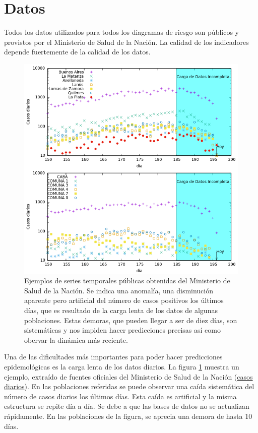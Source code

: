 \documentclass[12pt,a4paper]{article}
\begin{document}
\section*{Datos}
Todos los datos utilizados para todos los diagramas de riesgo 
son públicos y provistos por el Ministerio de Salud de la Nación.
La calidad de los indicadores depende fuertemente de la calidad de los datos.
\begin{figure}
\begin{center}
\includegraphics[width=14cm,clip=true]{datosdemorados2.png}
\end{center}
\caption{
Ejemplos de series temporales públicas 
obtenidas del Ministerio de Salud de la Nación. 
Se indica una anomalía, una disminución aparente pero artificial 
del número de casos positivos los últimos días, 
que es resultado de la carga lenta de los datos de 
algunas poblaciones. Estas demoras, que pueden llegar a ser de diez días, 
son sistemáticas y nos impiden hacer predicciones precisas así como obervar la 
dinámica más reciente. 
}
\label{fig:lento}
\end{figure}



Una de las dificultades más importantes para poder hacer predicciones epidemológicas es la carga lenta de los datos diarios. La figura \ref{fig:lento} muestra un ejemplo, extraído de fuentes oficiales del Ministerio de Salud de la Nación (\hyperref[https://sisa.msal.gov.ar/datos/descargas/covid-19/]{casos diarios}). En las poblaciones referidas se puede observar una caída sistemática del número de casos diarios los últimos días. Esta caída es artificial y la misma estructura se repite día a día. Se debe a que las bases de datos no se actualizan rápidamente. En las poblaciones de la figura, se aprecia una demora de hasta 10 días.
\end{document}
